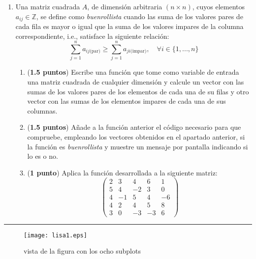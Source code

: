 \begin{enumerate}
\begin{enumerate}
\item \label{ap2} (\textbf{1.5 puntos}) Crea un un \emph{live script} que genere dos  vectores de frecuencias: \texttt{W1} y \texttt{W2} de  modo que el primero contenga los números impares comprendidos entre $1$ y $7$ y el segundo los números pares comprendidos entres $2$ y $8$.  Emplea la función creada en el apartado anterior para calcular el valor de las trayectorias obtenidas tomando como entradas para  $\omega_1, \omega_2$,  todos los pares posibles de la forma: \texttt{W1(i)} y \texttt{W2(j)}. Supón que no hay tercera entrada $a$. Realiza los cálculos empleando bucles.

\item (\textbf{1 punto}) Añade a tu programa el código necesario para que dibuje cada resultado en un \emph{subplot} de modo que la figura resultante tenga $4\times4$ \emph{subplots} (ver figura al dorso).  Debes crear los \emph{subplots} empleando los mismos bucles del apartados anterior. 

\item (\textbf{0.5 puntos}) Repite los cálculos de los apartados c) y d) pero tomando ahora $a=1$.
\end{enumerate}

\item Una matriz cuadrada $A$, de dimensión arbitraria $(n\times n)$, cuyos elementos $a_{ij} \in \mathbb{Z}$, se define como \emph{buenrollista} cuando las suma de los valores pares de cada fila es mayor o igual que la suma de los valores  impares de la columna correspondiente, i.e., satisface la siguiente relación:
\begin{equation}
	\sum_{j=1}^n a_{ij\text{(par)}} \geq \sum_{j=1}^n a_{ji\text{(impar)}}, \quad \forall i\in\{1,...,n\}
\end{equation}

\begin{enumerate}
\item (\textbf{1.5 puntos}) Escribe  una función que tome como variable de entrada una matriz cuadrada de cualquier dimensión 
y calcule un vector con las sumas de los valores pares de los elementos de cada una de su filas  y otro vector con las sumas de los elementos impares de cada una de sus columnas.
\item (\textbf{1.5 puntos}) Añade a la función anterior el código necesario para que compruebe, empleando los vectores obtenidos en el apartado anterior, si la función es \emph{buenrollista} y muestre un mensaje por pantalla indicando si lo es o no.
\item (\textbf{1 punto}) Aplica la función desarrollada a la siguiente matriz:
\begin{equation*}
\begin{pmatrix}
2&3&4&6&1\\
5&4&-2&3&0\\
4&-1&5&4&-6\\
4&2&4&5&8\\
3&0&-3&-3&6
\end{pmatrix}
\end{equation*}
\end{enumerate}
\end{enumerate}
\noindent\rule{\textwidth}{0.4pt}
\begin{figure}[h]
\centering
\texttt{[image: lisa1.eps]}
\caption{vista de la figura con los ocho subplots} \label{fig:1}
\end{figure}
